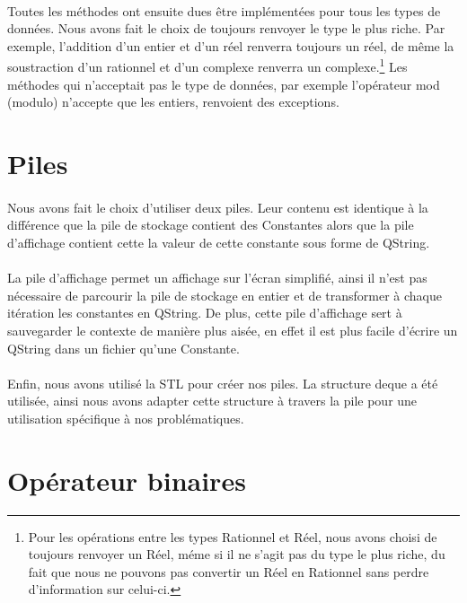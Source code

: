 \documentclass[a4paper,11pt]{report}
\begin{document}
		\paragraph{}Toutes les méthodes ont ensuite dues être implémentées pour tous les types de données. Nous avons fait le choix de toujours renvoyer le type le plus riche. Par exemple, l'addition d'un entier et d'un réel renverra toujours un réel, de même la soustraction d'un rationnel et d'un complexe renverra un complexe.\footnote{Pour les opérations entre les types Rationnel et Réel, nous avons choisi de toujours renvoyer un Réel, méme si il ne s'agit pas du type le plus riche, du fait que nous ne pouvons pas convertir un Réel en Rationnel sans perdre d'information sur celui-ci.} Les méthodes qui n'acceptait pas le type de données, par exemple l'opérateur mod (modulo) n'accepte que les entiers, renvoient des exceptions.

	\section{Piles}
		\paragraph{}Nous avons fait le choix d'utiliser deux piles. Leur contenu est identique à la différence que la pile de stockage contient des Constantes alors que la pile d’affichage contient cette la valeur de cette constante sous forme de QString.
		
		\paragraph{}La pile d’affichage permet un affichage sur l’écran simplifié, ainsi il n'est pas nécessaire de parcourir la pile de stockage en entier et de transformer à chaque itération les constantes en QString. De plus, cette pile d'affichage sert à sauvegarder le contexte de manière plus aisée, en effet il est plus facile d'écrire un QString dans un fichier qu'une Constante.
		
		\paragraph{}Enfin, nous avons utilisé la STL pour créer nos piles. La structure deque a été utilisée, ainsi nous avons adapter cette structure à travers la pile pour une utilisation spécifique à nos problématiques.
		
	\section{Opérateur binaires}
\end{document}
